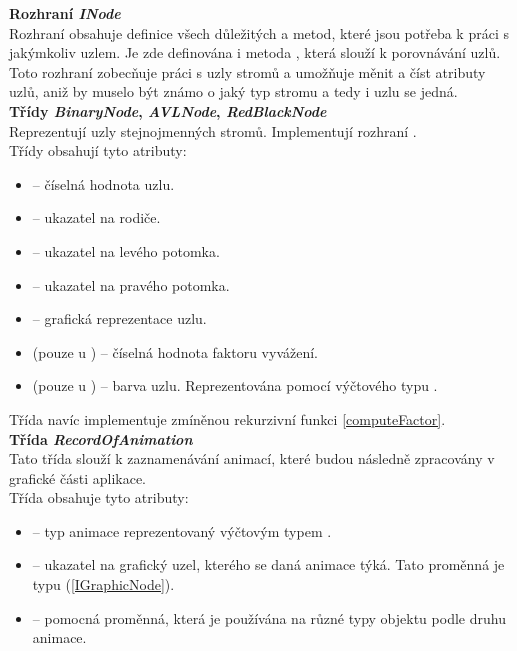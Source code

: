 \documentclass[
  biblatex=false,
  font=serif,
  glossaries=false,
  tables=false,
  theorems=false,
  index
]{kidiplom}
\begin{document}
\noindent \textbf{Rozhraní \textit{INode}}\\
\indent Rozhraní  obsahuje definice všech důležitých  a  metod, které jsou potřeba k práci s jakýmkoliv uzlem. Je zde definována i metoda , která slouží k porovnávání uzlů. Toto rozhraní zobecňuje práci s uzly stromů a umožňuje měnit a číst atributy uzlů, aniž by muselo být známo o jaký typ stromu a tedy i uzlu se jedná.\\

\noindent \textbf{Třídy \textit{BinaryNode}, \textit{AVLNode}, \textit{RedBlackNode}}\\
\indent Reprezentují uzly stejnojmenných stromů. Implementují rozhraní .\\
\noindent Třídy obsahují tyto atributy:
\begin{itemize}
\item {} -- číselná hodnota uzlu.
\item {} -- ukazatel na rodiče.
\item {} -- ukazatel na levého potomka.
\item {} -- ukazatel na pravého potomka.
\item {} -- grafická reprezentace uzlu.
\item {}(pouze u ) -- číselná hodnota faktoru vyvážení.
\item {}(pouze u ) -- barva uzlu. Reprezentována pomocí výčtového typu .
\end{itemize}

\noindent Třída  navíc implementuje zmíněnou rekurzivní funkci  \ref{computeFactor}.\\

\noindent \textbf{Třída \textit{RecordOfAnimation}}\\
\indent Tato třída slouží k zaznamenávání animací, které budou následně zpracovány v grafické části aplikace.\\
\noindent Třída obsahuje tyto atributy: 
\begin{itemize}
\item {} -- typ animace reprezentovaný výčtovým typem .
\item {} -- ukazatel na grafický uzel, kterého se daná animace týká. Tato proměnná je typu  (\ref{IGraphicNode}).
\item {} -- pomocná proměnná, která je používána na různé typy objektu podle druhu animace.
\end{itemize}
\end{document}
